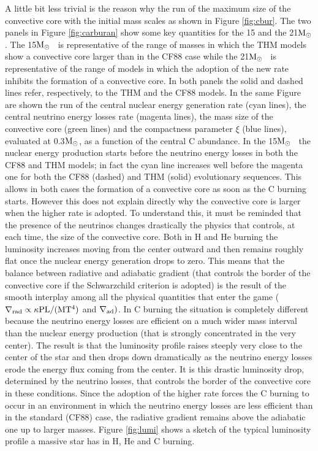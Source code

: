 \documentclass{aastex631}
\newcommand{\msun}{$\rm M_\odot$}
\begin{document}
A little bit less trivial is the reason why the run of the maximum size of the convective core with the initial mass scales as shown in Figure \ref{fig:cbur}. The two panels in Figure \ref{fig:carburan} show some key quantities for the 15 and the 21\msun. The 15\msun~ is representative of the range of masses in which the THM models show a convective core larger than in the CF88 case while the 21\msun~ is representative of the range of models in which the adoption of the new rate inhibits the formation of a convective core. In both panels the solid and dashed lines refer, respectively, to the THM and the CF88 models. In the same Figure are shown the run of the central nuclear energy generation rate (cyan lines), the central neutrino energy losses rate (magenta lines), the mass size of the convective core (green lines) and the compactness parameter $\xi$ (blue lines), evaluated at 0.3\msun, as a function of the central C abundance. In the 15\msun~ the nuclear energy production starts before the neutrino energy losses in both the CF88 and THM models; in fact the cyan line increases well before the magenta one for both the CF88 (dashed) and THM (solid) evolutionary sequences. This allows in both cases the formation of a convective core as soon as the C burning starts. However this does not explain directly why the convective core is larger when the higher rate is adopted. To understand this, it must be reminded that the presence of the neutrinos changes drastically the physics that controls, at each time, the size of the convective core. Both in H and He burning the luminosity increases moving from the center outward and then remains roughly flat once the nuclear energy generation drops to zero. This means that the balance between radiative and adiabatic gradient (that controls the border of the convective core if the Schwarzchild criterion is adopted) is the result of the smooth interplay among all the physical quantities that enter the game ($\rm \nabla_{rad}\propto \kappa P L / (M T^4)$ and $\rm \nabla_{ad})$. In C burning the situation is completely different because the neutrino energy losses are efficient on a much wider mass interval than the nuclear energy production (that is strongly concentrated in the very center). The result is that the luminosity profile raises steeply very close to the center of the star and then drops down dramatically as the neutrino energy losses erode the energy flux coming from the center. It is this drastic luminosity drop, determined by the neutrino losses, that controls the border of the convective core in these conditions. Since the adoption of the higher rate forces the C burning to occur in an environment in which the neutrino energy losses are less efficient than in the standard (CF88) case, the radiative gradient remains above the adiabatic one up to larger masses. Figure \ref{fig:lumi} shows a sketch of the typical luminosity profile a massive star has in H, He and C burning.
\end{document}

